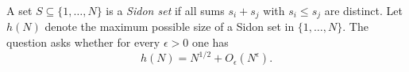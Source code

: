 A set $S\subseteq\{1,\dots,N\}$ is a \emph{Sidon set} if all sums $s_i+s_j$ with $s_i\le s_j$ are distinct.
Let $h(N)$ denote the maximum possible size of a Sidon set in $\{1,\dots,N\}$.
The question asks whether for every $\epsilon>0$ one has
\[
 h(N)=N^{1/2}+O_{\epsilon}(N^{\epsilon}).
\]
